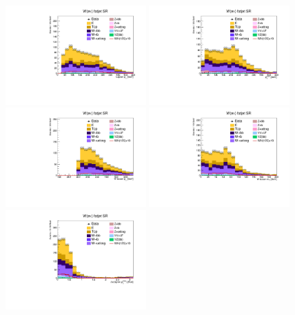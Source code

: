\begin{figure}[tbp]
  \begin{center}
    \includegraphics[width=0.48\textwidth]{figures/wlnhbb2016/boosted/WenWHFJSR_lepton1Pt.pdf}
    \includegraphics[width=0.48\textwidth]{figures/wlnhbb2016/boosted/WenWHFJSR_pfmet.pdf}
    \includegraphics[width=0.48\textwidth]{figures/wlnhbb2016/boosted/WenWHFJSR_topWBosonPt.pdf}
    \includegraphics[width=0.48\textwidth]{figures/wlnhbb2016/boosted/WenWHFJSR_mT.pdf}
    \includegraphics[width=0.48\textwidth]{figures/wlnhbb2016/boosted/WenWHFJSR_deltaPhiLep1Met.pdf}

\end{center}
\end{figure}
